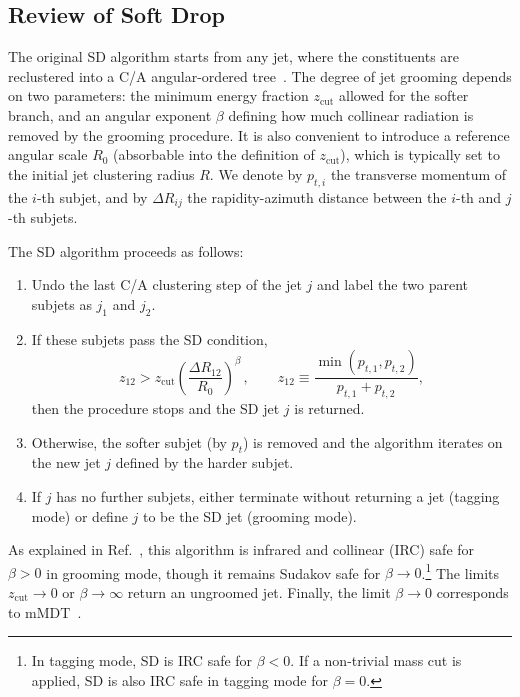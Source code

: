 \documentclass[11pt,a4paper]{article}
\newcommand{\zcut}{z_\text{cut}}
\DeclareRobustCommand{\Ref}[1]{Ref.~\cite{#1}}
\begin{document}
\subsection{Review of Soft Drop} 
\label{sec:SD}

The original SD algorithm starts from any jet, where the constituents are reclustered into a C/A angular-ordered tree~\cite{Dokshitzer:1997in,Wobisch:1998wt}.
%
The degree of jet grooming depends on two parameters: the minimum energy fraction
$z_{\text{cut}}$ allowed for the softer branch, and an angular exponent
$\beta$ defining how much collinear radiation is removed by the
grooming procedure.
%
It is also convenient to introduce a reference angular scale $R_0$ (absorbable into the definition of $z_{\text{cut}}$), which is typically set to the initial jet clustering radius $R$.
%
We denote by $p_{t,i}$ the transverse momentum of the $i$-th subjet, and
by $\Delta R_{ij}$ the rapidity-azimuth distance between the $i$-th and $j$-th
subjets.

The SD algorithm proceeds as follows:
\begin{enumerate}
\item Undo the last C/A clustering step of the jet $j$ and label the
  two parent subjets as $j_1$ and $j_2$.
\item If these subjets pass the SD condition,
  \begin{equation}
    \label{eq:SD-crit}
    z_{12} > \zcut \left(\frac{\Delta R_{12}}{R_0}\right)^\beta\,, \qquad z_{12} \equiv \frac{\min(p_{t,1},p_{t,2})}{p_{t,1} + p_{t,2}},
  \end{equation}
  then the procedure stops and the SD jet $j$ is returned.
\item Otherwise, the softer subjet (by $p_t$) is removed and the algorithm
  iterates on the new jet $j$ defined by the harder subjet.
\item If $j$ has no further subjets, either terminate without
  returning a jet (tagging mode) or define $j$ to be the SD jet
  (grooming mode).
\end{enumerate}
As explained in \Ref{Larkoski:2014wba}, this algorithm is infrared and collinear (IRC) safe for $\beta>0$ in grooming mode, though it remains
Sudakov safe \cite{Larkoski:2013paa,Larkoski:2015lea} for $\beta\rightarrow 0$.\footnote{In tagging mode, SD is IRC safe for $\beta < 0$.  If a non-trivial mass cut is applied, SD is also IRC safe in tagging mode for $\beta  = 0$.}
%
The limits $\zcut\rightarrow 0$ or $\beta\rightarrow \infty$ return an
ungroomed jet.
%
Finally, the limit $\beta\to 0$ corresponds to mMDT~\cite{Dasgupta:2013ihk}.
\end{document}
